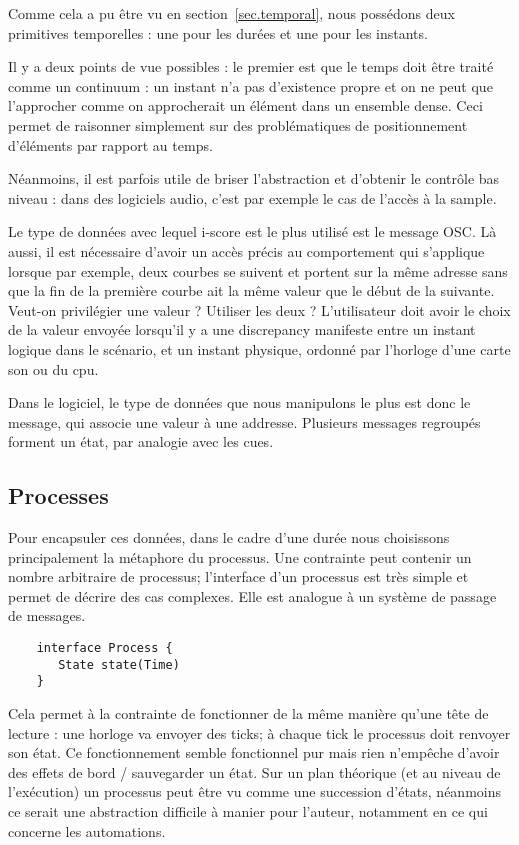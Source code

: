 \documentclass{sigchi}
\begin{document}
Comme cela a pu être vu en section~\ref{sec.temporal}, nous possédons deux primitives temporelles : une pour les durées et une pour les instants.

Il y a deux points de vue possibles : le premier est que le temps doit être traité comme un continuum : un instant n'a pas d'existence propre et on ne peut que l'approcher comme on approcherait un élément dans un ensemble dense. Ceci permet de raisonner simplement sur des problématiques de positionnement d'éléments par rapport au temps.

Néanmoins, il est parfois utile de briser l'abstraction et d'obtenir le contrôle bas niveau : dans des logiciels audio, c'est par exemple le cas de l'accès à la sample.

Le type de données avec lequel i-score est le plus utilisé est le message OSC. Là aussi, il est nécessaire d'avoir un accès précis au comportement qui s'applique lorsque par exemple, deux courbes se suivent et portent sur la même adresse sans que la fin de la première courbe ait la même valeur que le début de la suivante. Veut-on privilégier une valeur ? Utiliser les deux ? L'utilisateur doit avoir le choix de la valeur envoyée lorsqu'il y a une discrepancy manifeste entre un instant logique dans le scénario, et un instant physique, ordonné par l'horloge d'une carte son ou du cpu.

Dans le logiciel, le type de données que nous manipulons le plus est donc le message, qui associe une valeur à une addresse. Plusieurs messages regroupés forment un état, par analogie avec les cues.

\subsection{Processes}
Pour encapsuler ces données, dans le cadre d'une durée nous choisissons principalement la métaphore du processus. Une contrainte peut contenir un nombre arbitraire de processus; l'interface d'un processus est très simple et permet de décrire des cas complexes. Elle est analogue à un système de passage de messages.

\begin{lstlisting}
    interface Process {
       State state(Time)
    }
\end{lstlisting}

Cela permet à la contrainte de fonctionner de la même manière qu'une tête de lecture : une horloge va envoyer des ticks; à chaque tick le processus doit renvoyer son état. Ce fonctionnement semble fonctionnel pur mais rien n'empêche d'avoir des effets de bord / sauvegarder un état.
Sur un plan théorique (et au niveau de l'exécution) un processus peut être vu comme une succession d'états, néanmoins ce serait une abstraction difficile à manier pour l'auteur, notamment en ce qui concerne les automations.
\end{document}
